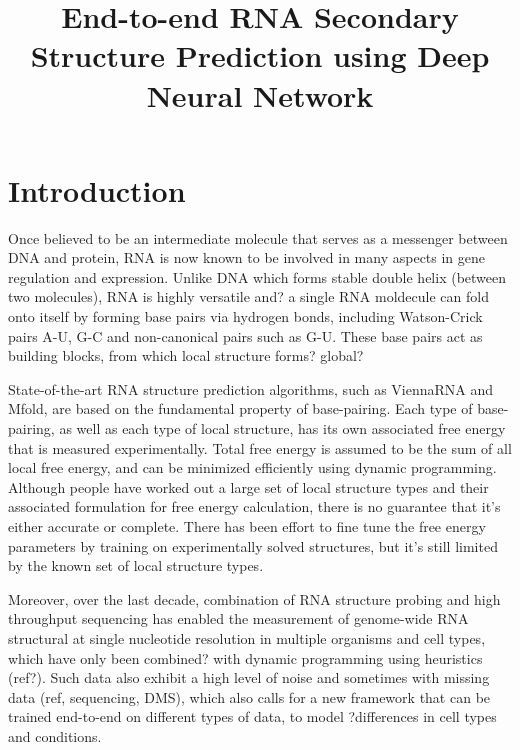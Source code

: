 \documentclass{article}
\title{End-to-end RNA Secondary Structure Prediction using Deep Neural Network}
\begin{document}
\maketitle



\section{Introduction}

Once believed to be an intermediate molecule that serves as a messenger between DNA and protein,
RNA is now known to be involved in many aspects in gene regulation and expression.
Unlike DNA which forms stable double helix (between two molecules), RNA is highly versatile
and? a single RNA moldecule can fold onto itself by
forming base pairs via hydrogen bonds, including Watson-Crick pairs A-U,
G-C and non-canonical pairs such as G-U.
These base pairs act as building blocks, from which local structure forms? global?

State-of-the-art RNA structure prediction algorithms,
such as ViennaRNA\cite{lorenz2011viennarna} and Mfold\cite{zuker2003mfold},
are based on the fundamental property of base-pairing.
Each type of base-pairing, as well as each type of local structure,
has its own associated free energy that is measured experimentally.
Total free energy is assumed to be the sum of all local free energy,
and can be minimized efficiently using dynamic programming.
Although people have worked out a large set of local structure types and
their associated formulation for free energy calculation,
there is no guarantee that it's either accurate or complete.
There has been effort to fine tune the free energy parameters by
training on experimentally solved structures\cite{andronescu2007efficient},
but it's still limited by the known set of local structure types.

Moreover, over the last decade,
combination of RNA structure probing and high throughput sequencing has enabled
the measurement of genome-wide RNA structural at single nucleotide resolution in multiple organisms and cell types,
which have only been combined? with dynamic programming using heuristics (ref?).
Such data also exhibit a high level of noise and sometimes with missing data (ref, sequencing, DMS),
which also calls for a new framework that can be trained end-to-end on different types of data,
to model ?differences in cell types and conditions.
\end{document}
